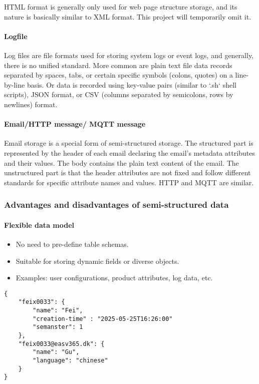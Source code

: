\documentclass{article}
\begin{document}
HTML format is generally only used for web page structure storage, and its nature is basically similar to XML format. This project will temporarily omit it.

\paragraph{Logfile}
Log files are file formats used for storing system logs or event logs, and generally, there is no unified standard.
More common are plain text file data records separated by spaces, tabs, or certain specific symbols (colons, quotes) on a line-by-line basis. Or data is recorded using key-value pairs (similar to `.sh` shell scripts), JSON format, or CSV (columns separated by semicolons, rows by newlines) format.

\paragraph{Email/HTTP message/ MQTT message}
Email storage is a special form of semi-structured storage. The structured part is represented by the header of each email declaring the email's metadata attributes and their values. The body contains the plain text content of the email. The unstructured part is that the header attributes are not fixed and follow different standards for specific attribute names and values. HTTP and MQTT are similar.

\subsubsection{Advantages and disadvantages of semi-structured data}

\paragraph{Flexible data model}
\begin{itemize}
    \item No need to pre-define table schemas.
    \item Suitable for storing dynamic fields or diverse objects.
    \item Examples: user configurations, product attributes, log data, etc.
\end{itemize}
\begin{lstlisting}
{
    "feix0033": {
        "name": "Fei",        
        "creation-time" : "2025-05-25T16:26:00"
        "semanster": 1
    },
    "feix0033@easv365.dk": {
        "name": "Gu",
        "language": "chinese"
    }
}
\end{lstlisting}
\end{document}
